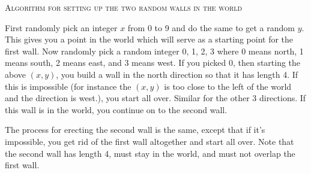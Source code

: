 \textsc{Algorithm for setting up the two random walls in the world}


First randomly pick an integer $x$ from 0 to 9 and do the same
to get a random $y$.
This gives you a point in the world which will serve
as a starting point for the
first wall.
Now randomly pick a random integer 0, 1, 2, 3
where 0 means north, 1 means south, 2 means east, and 3 means west.
If you picked 0, then starting the above $(x,y)$, you build a wall
in the north direction so that it has length 4.
If this is impossible (for instance the $(x,y)$ is too close to the
left of the world and the direction is west.), you start all over.
Similar for the other 3 directions.
If this wall is in the world, you continue on to the second wall.

The process for erecting the second wall is the same,
except that if it's impossible, you get rid of the first wall altogether
and start all over.
Note that the second wall has length 4, must stay in the world,
and must not overlap the first wall.



